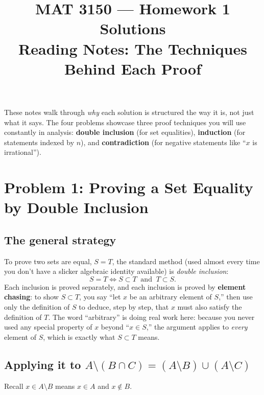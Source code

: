 \documentclass[11pt]{article}
\title{MAT 3150 --- Homework 1 Solutions\\
\large Reading Notes: The Techniques Behind Each Proof}
\author{}
\date{}
\begin{document}
\maketitle

These notes walk through \emph{why} each solution is structured the way
it is, not just what it says. The four problems showcase three proof
techniques you will use constantly in analysis: \textbf{double
inclusion} (for set equalities), \textbf{induction} (for statements
indexed by $n$), and \textbf{contradiction} (for negative statements
like ``$x$ is irrational'').

\section*{Problem 1: Proving a Set Equality by Double Inclusion}

\subsection*{The general strategy}
To prove two sets are equal, $S = T$, the standard method (used almost
every time you don't have a slicker algebraic identity available) is
\emph{double inclusion}:
\[
  S = T \iff S \subset T \ \text{ and } \ T \subset S.
\]
Each inclusion is proved separately, and each inclusion is proved by
\textbf{element chasing}: to show $S \subset T$, you say ``let $x$ be an
arbitrary element of $S$,'' then use only the definition of $S$ to
deduce, step by step, that $x$ must also satisfy the definition of $T$.
The word ``arbitrary'' is doing real work here: because you never used
any special property of $x$ beyond ``$x \in S$,'' the argument applies
to \emph{every} element of $S$, which is exactly what $S\subset T$
means.

\subsection*{Applying it to $A\setminus(B\cap C) = (A\setminus B)\cup(A\setminus C)$}
Recall $x \in A\setminus B$ means $x \in A$ and $x \notin B$.
\end{document}
